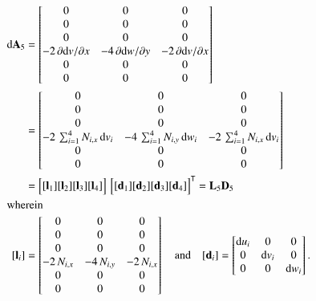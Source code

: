 \begin{subequations}
	\begin{align}
		\mathrm{d} \mathbf{A}_5 & =  \begin{bmatrix}
			0 & 0 &  0   \\
			0 &  0 & 0  \\
			0 &  0 & 0 \\
			- 2 \, \partial \mathrm{d} v / \partial x & - 4 \, \partial \mathrm{d} w / \partial y & - 2 \, \partial \mathrm{d} v / \partial x  \\
			0 &  0 & 0  \\
			0 &  0 & 0  \end{bmatrix} \notag\\
		& = \begin{bmatrix}
			0 & 0 &  0   \\
			0 &  0 & 0  \\
			0 &  0 & 0 \\
			- 2 \, \sum\nolimits_{i=1}^4 N_{i,x} \, \mathrm{d} v_i  & - 4 \, \sum\nolimits_{i=1}^4 N_{i,y} \, \mathrm{d} w_i  & - 2 \, \sum\nolimits_{i=1}^4 N_{i,x} \, \mathrm{d} v_i   \\
			0 &  0 & 0  \\
			0 &  0 & 0  \end{bmatrix} \notag \\	
		& = \begin{bmatrix}
			[\mathbf{l}_1] [\mathbf{l}_2] [\mathbf{l}_3] [\mathbf{l}_4] 
		\end{bmatrix}  \, \begin{bmatrix} [\mathbf{d}_1] [\mathbf{d}_2] [\mathbf{d}_3] [\mathbf{d}_4] \end{bmatrix}^{\mathsf{T}}
	= \mathbf{L}_5 \mathbf{D}_5 \\
		\intertext{wherein}
		[\mathbf{l}_i] & = \begin{bmatrix}
			0 & 0 &  0   \\
			0 &  0 & 0  \\
			0 &  0 & 0 \\
			- 2 \, N_{i,x}  & - 4 \,  N_{i,y}  & - 2 \, N_{i,x}  \\
			0 &  0 & 0  \\
			0 &  0 & 0  \end{bmatrix}    \quad \text{and} \quad	[\mathbf{d}_i] = \begin{bmatrix}
			\mathrm{d} u_i & 0  & 0  \\
			0 &  \mathrm{d} v_i   & 0  \\
			0 & 0 & \mathrm{d} w_i \end{bmatrix} .
	\end{align}
\end{subequations}

